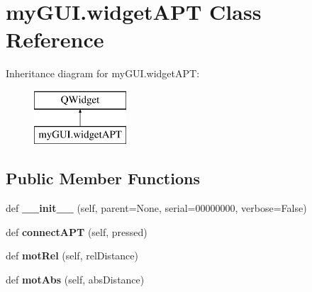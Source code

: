 \hypertarget{classmy_g_u_i_1_1widget_a_p_t}{}\section{my\+G\+U\+I.\+widget\+A\+PT Class Reference}
\label{classmy_g_u_i_1_1widget_a_p_t}
Inheritance diagram for my\+G\+U\+I.\+widget\+A\+PT\+:\begin{figure}[H]
\begin{center}
\leavevmode
\includegraphics[height=2.000000cm]{classmy_g_u_i_1_1widget_a_p_t}
\end{center}
\end{figure}
\subsection*{Public Member Functions}
\begin{DoxyCompactItemize}
\item 
def {\bfseries \+\_\+\+\_\+init\+\_\+\+\_\+} (self, parent=None, serial=00000000, verbose=False)\hypertarget{classmy_g_u_i_1_1widget_a_p_t_a79118ed3dbdc0f919fcb4418dd013142}{}\label{classmy_g_u_i_1_1widget_a_p_t_a79118ed3dbdc0f919fcb4418dd013142}

\item 
def {\bfseries connect\+A\+PT} (self, pressed)\hypertarget{classmy_g_u_i_1_1widget_a_p_t_ac81c62c1c91f332c184dd52eed317a41}{}\label{classmy_g_u_i_1_1widget_a_p_t_ac81c62c1c91f332c184dd52eed317a41}

\item 
def {\bfseries mot\+Rel} (self, rel\+Distance)\hypertarget{classmy_g_u_i_1_1widget_a_p_t_a6ac40c816423cad7ffd9fddff3010524}{}\label{classmy_g_u_i_1_1widget_a_p_t_a6ac40c816423cad7ffd9fddff3010524}

\item 
def {\bfseries mot\+Abs} (self, abs\+Distance)\hypertarget{classmy_g_u_i_1_1widget_a_p_t_a8914b61f99a78cda26f363e2cd010235}{}\label{classmy_g_u_i_1_1widget_a_p_t_a8914b61f99a78cda26f363e2cd010235}

\end{DoxyCompactItemize}

